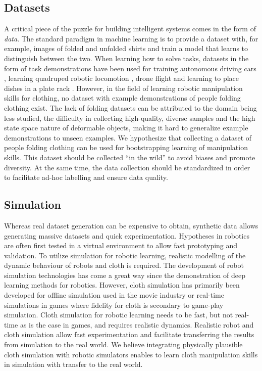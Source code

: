 \documentclass[\home/main.tex]{subfiles}
\begin{document}
\subsection{Datasets}
A critical piece of the puzzle for building intelligent systems comes in the form of \emph{data}. The standard paradigm in machine learning is to provide a dataset with, for example, images of folded and unfolded shirts and train a model that learns to distinguish between the two. When learning how to solve tasks, datasets in the form of task demonstrations have been used for training autonomous driving cars \autocite{bojarski2016end}, learning quadruped robotic locomotion \autocite{peng2020learning}, drone flight \autocite{Giusti2016} and learning to place dishes in a plate rack \autocite{Finn2016}. However, in the field of learning robotic manipulation skills for clothing, no dataset with example demonstrations of people folding clothing exist. The lack of folding datasets can be attributed to the domain being less studied, the difficulty in collecting high-quality, diverse samples and the high state space nature of deformable objects, making it hard to generalize example demonstrations to unseen examples. We hypothesize that collecting a dataset of people folding clothing can be used for bootstrapping learning of manipulation skills. This dataset should be collected \enquote{in the wild} to avoid biases and promote diversity. At the same time, the data collection should be standardized in order to facilitate ad-hoc labelling and ensure data quality.

\subsection{Simulation}
Whereas real dataset generation can be expensive to obtain, synthetic data allows generating massive datasets and quick experimentation. Hypotheses in robotics are often first tested in a virtual environment to allow fast prototyping and validation. To utilize simulation for robotic learning, realistic modelling of the dynamic behaviour of robots and cloth is required. The development of robot simulation technologies has come a great way since the demonstration of deep learning methods for robotics. However, cloth simulation has primarily been developed for offline simulation used in the movie industry or real-time simulations in games where fidelity for cloth is secondary to game-play simulation. Cloth simulation for robotic learning needs to be fast, but not real-time as is the case in games, and requires realistic dynamics. Realistic robot and cloth simulation allow fast experimentation and facilitate transferring the results from simulation to the real world. We believe integrating physically plausible cloth simulation with robotic simulators enables to learn cloth manipulation skills in simulation with transfer to the real world. 
\end{document}
